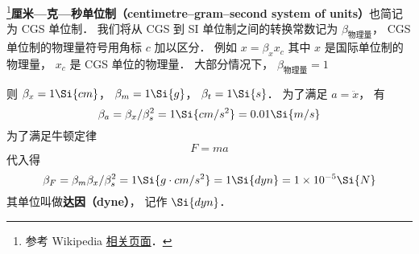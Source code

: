 
\begin{issues}
\issueDraft
{}
\end{issues}


\footnote{参考 Wikipedia \href{https://en.wikipedia.org/wiki/Centimetre-gram-second_system_of_units}{相关页面}．}\textbf{厘米—克—秒单位制（centimetre–gram–second system of units）}也简记为 CGS 单位制． 我们将从 CGS 到 SI 单位制之间的转换常数记为 $\beta_\text{物理量}$， CGS 单位制的物理量符号用角标 $c$ 加以区分． 例如 $x = \beta_x x_c$ 其中 $x$ 是国际单位制的物理量， $x_c$ 是 CGS 单位的物理量． 大部分情况下， $\beta_\text{物理量} = 1$

则 $\beta_x = 1\Si{cm}$， $\beta_m = 1\Si{g}$， $\beta_t = 1\Si{s}$．
为了满足 $a = \ddot x$， 有
\begin{equation}
\beta_a = \beta_x/\beta_s^2 = 1\Si{cm/s^2} = 0.01 \Si{m/s}
\end{equation}
为了满足牛顿定律
\begin{equation}
F = ma
\end{equation}
代入得
\begin{equation}
\beta_F = \beta_m \beta_x/\beta_s^2 = 1\Si{g \cdot cm/s^2} = 1\Si{dyn} = 1\times 10^{-5} \Si{N}
\end{equation}
其单位叫做\textbf{达因（dyne）}， 记作 $\Si{dyn}$．

